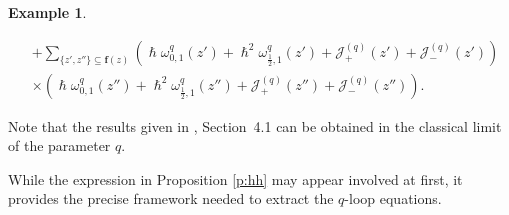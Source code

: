 \documentclass[reqno,11pt]{amsart}
\theoremstyle{plain}
\theoremstyle{definition}
\newtheorem{example}[theorem]{Example}
\theoremstyle{remark}
\numberwithin{equation}{section}
\newcommand{\1}{\mathds{1}}
\newcommand{\2}{\frac{1}{2}}
\begin{document}
{\begin{example}
{\begin{enumerate}
\begin{align}
												&+ \sum_{\{z', z''\} \subseteq \mathbf{f}(z)} \left( \hslash \omega^q_{0,1}(z') + \hslash^2 \omega^q_{\frac{1}{2},1}(z') + \mathcal{J}^{(q)}_{+}(z') + \mathcal{J}^{(q)}_{-}(z') \right) \nonumber \\
												& \times \left( \hslash \omega^q_{0,1}(z'') + \hslash^2 \omega^q_{\frac{1}{2},1}(z'') + \mathcal{J}^{(q)}_{+}(z'') + \mathcal{J}^{(q)}_{-}(z'') \right).
											\end{align}
									\end{enumerate}}
								\end{example}
								Note that the results given in {\cite{BKS23}, Section~4.1} can be obtained in the classical limit of the parameter $q$.  
								
								While the expression in Proposition \ref{p:hh} may appear involved at first, it provides the precise framework needed to extract the $q$-loop equations.
								
}
\end{document}

